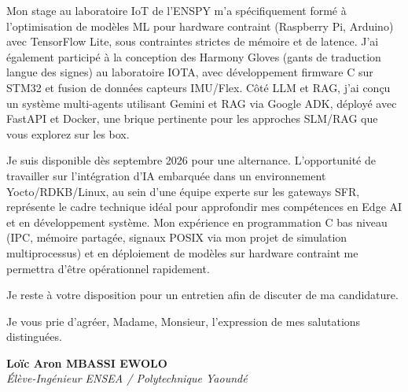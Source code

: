 \documentclass[a4paper,11pt]{article}
\begin{document}
Mon stage au laboratoire IoT de l'ENSPY m'a spécifiquement formé à l'optimisation de modèles ML pour hardware contraint (Raspberry Pi, Arduino) avec TensorFlow Lite, sous contraintes strictes de mémoire et de latence. J'ai également participé à la conception des Harmony Gloves (gants de traduction langue des signes) au laboratoire IOTA, avec développement firmware C sur STM32 et fusion de données capteurs IMU/Flex. Côté LLM et RAG, j'ai conçu un système multi-agents utilisant Gemini et RAG via Google ADK, déployé avec FastAPI et Docker, une brique pertinente pour les approches SLM/RAG que vous explorez sur les box.

Je suis disponible dès septembre 2026 pour une alternance. L'opportunité de travailler sur l'intégration d'IA embarquée dans un environnement Yocto/RDKB/Linux, au sein d'une équipe experte sur les gateways SFR, représente le cadre technique idéal pour approfondir mes compétences en Edge AI et en développement système. Mon expérience en programmation C bas niveau (IPC, mémoire partagée, signaux POSIX via mon projet de simulation multiprocessus) et en déploiement de modèles sur hardware contraint me permettra d'être opérationnel rapidement.

Je reste à votre disposition pour un entretien afin de discuter de ma candidature.

Je vous prie d'agréer, Madame, Monsieur, l'expression de mes salutations distinguées.

\vspace{0.8cm}

\textbf{Loïc Aron MBASSI EWOLO}\\
\textit{Élève-Ingénieur ENSEA / Polytechnique Yaoundé}
\end{document}
